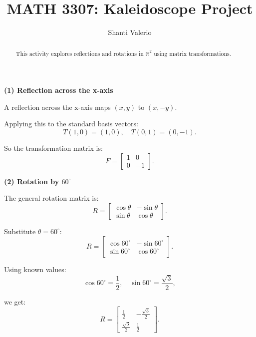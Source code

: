 \documentclass{ximera}
\title{MATH 3307: Kaleidoscope Project}
\author{Shanti Valerio}
\begin{document}
\begin{abstract}
    This activity explores reflections and rotations in $\mathbb{R}^2$ using matrix transformations.
\end{abstract}
\maketitle

\begin{exercise}
\textbf{(1) Reflection across the x-axis}

A reflection across the x-axis maps $(x, y)$ to $(x, -y)$.

Applying this to the standard basis vectors:
\[
T(1,0) = (1,0), \quad T(0,1) = (0,-1).
\]

So the transformation matrix is:
\[
F = \begin{bmatrix} 1 & 0 \\ 0 & -1 \end{bmatrix}.
\]

\end{exercise}

\begin{exercise}
\textbf{(2) Rotation by $60^\circ$}

The general rotation matrix is:
\[
R = \begin{bmatrix} \cos \theta & -\sin \theta \\ \sin \theta & \cos \theta \end{bmatrix}.
\]

Substitute $\theta = 60^\circ$:
\[
R = \begin{bmatrix} \cos 60^\circ & -\sin 60^\circ \\ \sin 60^\circ & \cos 60^\circ \end{bmatrix}.
\]

Using known values:
\[
\cos 60^\circ = \frac{1}{2}, \quad \sin 60^\circ = \frac{\sqrt{3}}{2},
\]

we get:
\[
R = \begin{bmatrix} \frac{1}{2} & -\frac{\sqrt{3}}{2} \\[6pt] \frac{\sqrt{3}}{2} & \frac{1}{2} \end{bmatrix}.
\]

\end{exercise}
\end{document}
